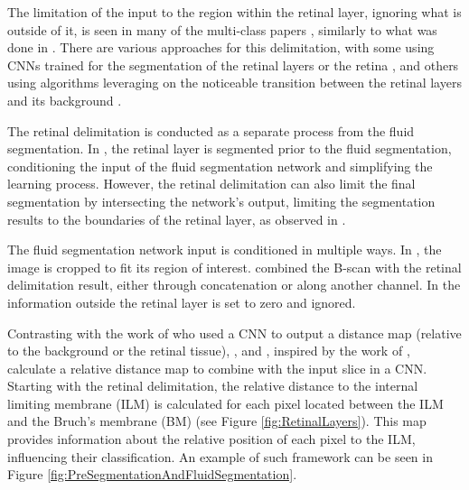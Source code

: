 \par
The limitation of the input to the region within the retinal layer, ignoring what is outside of it, is seen in many of the multi-class papers \parencite{Hassan2021b, Hassan2021a, Lu2019, Mantel2021, Rahil2023, Tang2022, Xing2022}, similarly to what was done in \textcite{Pawan2021}. There are various approaches for this delimitation, with some using CNNs trained for the segmentation of the retinal layers or the retina \parencite{Mantel2021, Tang2022}, and others using algorithms leveraging on the noticeable transition between the retinal layers and its background \parencite{Hassan2021b, Hassan2021a, Lu2019, Rahil2023, Xing2022, Pawan2021}. 
\par
The retinal delimitation is conducted as a separate process from the fluid segmentation. In \parencite{Tang2022, Hassan2021b, Hassan2021a, Lu2019, Rahil2023, Xing2022}, the retinal layer is segmented prior to the fluid segmentation, conditioning the input of the fluid segmentation network and simplifying the learning process. However, the retinal delimitation can also limit the final segmentation by intersecting the network's output, limiting the segmentation results to the boundaries of the retinal layer, as observed in \textcite{Mantel2021}.
\par
The fluid segmentation network input is conditioned in multiple ways. In \textcite{Xing2022}, the image is cropped to fit its region of interest. \parencite{Rahil2023, Tang2022, Lu2019} combined the B-scan with the retinal delimitation result, either through concatenation or along another channel. In \parencite{Hassan2021b, Hassan2021a, Pawan2021} the information outside the retinal layer is set to zero and ignored. 
\par
Contrasting with the work of \textcite{Liu2021} who used a CNN to output a distance map (relative to the background or the retinal tissue), \textcite{Tang2022}, and \textcite{Rahil2023}, inspired by the work of \textcite{Lu2019}, calculate a relative distance map to combine with the input slice in a CNN. Starting with the retinal delimitation, the relative distance to the internal limiting membrane (ILM) is calculated for each pixel located between the ILM and the Bruch's membrane (BM) (see Figure \ref{fig:RetinalLayers}). This map provides information about the relative position of each pixel to the ILM, influencing their classification. An example of such framework can be seen in Figure \ref{fig:PreSegmentationAndFluidSegmentation}.
\par

